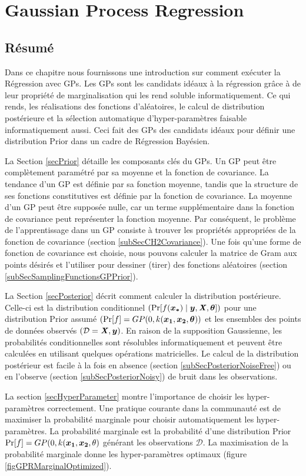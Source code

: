 \chapter{Gaussian Process Regression}
\label{chapGp}

\begin{mdframed}[hidealllines=true,backgroundcolor=lightgray!20]
\section*{Résumé}
Dans ce chapitre nous fournissons une introduction sur comment exécuter la Régression avec GPs. Les GPs sont les candidats idéaux à la régression grâce à de leur propriété de marginalisation qui les rend soluble informatiquement. Ce qui rends, les réalisations des fonctions d'aléatoires, le calcul de distribution postérieure et la sélection automatique d'hyper-paramètres faisable informatiquement aussi. Ceci fait des GPs des candidats idéaux pour définir une distribution Prior dans un cadre de Régression Bayésien. 

La Section \ref{secPrior} détaille les composants clés du GPs. Un GP peut être complètement paramétré par sa moyenne et la fonction de covariance. La tendance d'un GP est définie par sa fonction moyenne, tandis que la structure de ses fonctions constitutives est définie par la fonction de covariance. La moyenne d'un GP peut être supposée nulle, car un terme supplémentaire dans la fonction de covariance peut représenter la fonction moyenne. Par conséquent, le problème de l'apprentissage dans un GP consiste à trouver les propriétés appropriées de la fonction de covariance (section  \ref{subSecCH2Covariance}). Une fois qu'une forme de fonction de covariance est choisie, nous pouvons calculer la matrice de Gram aux points désirés et l'utiliser pour dessiner (tirer) des fonctions aléatoires (section \ref{subSecSamplingFunctionsGPPrior}).

La Section \ref{secPosterior} décrit comment calculer la distribution postérieure. Celle-ci est la distribution conditionnel $(\Pr[f(\boldsymbol{x_{*}}) \mid \boldsymbol{y}, \bm{\mathit{X}}, \boldsymbol{\theta}])$  pour une distribution Prior assumé $(\Pr[f] = GP(0, k(\boldsymbol{x_1}, \boldsymbol{x_2}, \boldsymbol{\theta}))$  et les ensembles des points de données observés $(\mathcal{D} = {\bm{\mathit{X}}, \boldsymbol{y}})$. En raison de la supposition Gaussienne, les probabilités conditionnelles sont résolubles informatiquement et peuvent être calculées en utilisant quelques opérations matricielles. Le calcul de la distribution postérieur est facile à la fois en absence (section \ref{subSecPosteriorNoiseFree}) ou en l'observe (section \ref{subSecPosteriorNoisy}) de bruit dans les observations.

La section \ref{secHyperParameter} montre l'importance de choisir les hyper-paramètres correctement. Une pratique courante dans la communauté est de maximiser la probabilité marginale pour choisir automatiquement les hyper-paramètres. La probabilité marginale est la probabilité d'une distribution Prior $\Pr[f] = GP(0, k(\boldsymbol{x_1}, \boldsymbol{x_2}, \theta)$  générant les observations $ \mathcal{D} $. La maximisation de la probabilité marginale donne les hyper-paramètres optimaux (figure \ref{figGPRMarginalOptimized}).
\end{mdframed}


